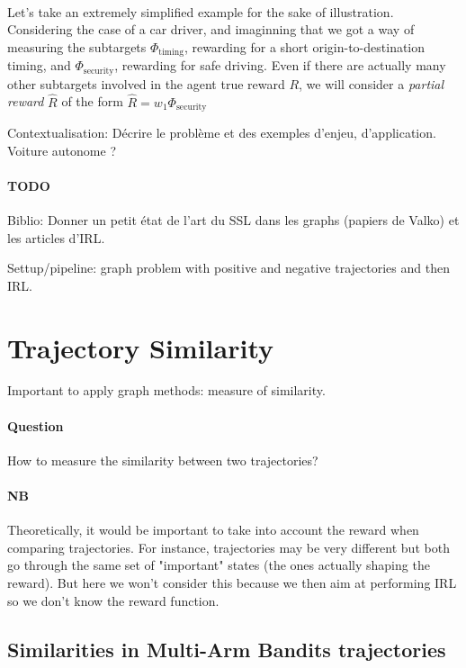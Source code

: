 \documentclass{article}
\begin{document}
\paragraph{}
Let's take an extremely simplified example for the sake of illustration. Considering the case of a car driver, and imaginning that we got a way of measuring the subtargets $\Phi_{\text{timing}}$, rewarding for a short origin-to-destination timing, and $\Phi_{\text{security}}$, rewarding for safe driving. Even if there are actually many other subtargets involved in the agent true reward $R$, we will consider a \emph{partial reward} $\hat R$ of the form $\hat R = w_1 \Phi_{\text{security}}$

Contextualisation: Décrire le problème et des exemples d'enjeu, d'application. Voiture autonome ?

\paragraph{TODO} Biblio: Donner un petit état de l'art du SSL dans les graphs (papiers de Valko) et les articles d'IRL.

Settup/pipeline: graph problem with positive and negative trajectories and then IRL.

\section{Trajectory Similarity}

Important to apply graph methods: measure of similarity.

\paragraph{Question}
How to measure the similarity between two trajectories?

\paragraph{NB} Theoretically, it would be important to take into account the reward when comparing trajectories. For instance, trajectories may be very different but both go through the same set of "important" states (the ones actually shaping the reward). But here we won't consider this because we then aim at performing IRL so we don't know the reward function.

\subsection{Similarities in Multi-Arm Bandits trajectories}
\end{document}

